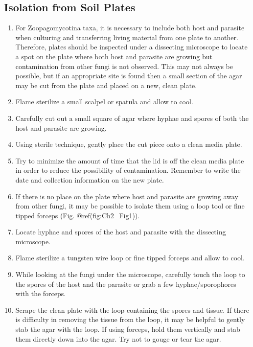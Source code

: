 \documentclass[]{book}
\providecommand{\tightlist}{%
  \setlength{\itemsep}{0pt}\setlength{\parskip}{0pt}}
\begin{document}
\subsection{Isolation from Soil
Plates}\label{isolation-from-soil-plates}

\begin{enumerate}
\def\labelenumi{\arabic{enumi}.}
\tightlist
\item
  For Zoopagomycotina taxa, it is necessary to include both host and
  parasite when culturing and transferring living material from one
  plate to another. Therefore, plates should be inspected under a
  dissecting microscope to locate a spot on the plate where both host
  and parasite are growing but contamination from other fungi is not
  observed. This may not always be possible, but if an appropriate site
  is found then a small section of the agar may be cut from the plate
  and placed on a new, clean plate.
\item
  Flame sterilize a small scalpel or spatula and allow to cool.\\
\item
  Carefully cut out a small square of agar where hyphae and spores of
  both the host and parasite are growing.
\item
  Using sterile technique, gently place the cut piece onto a clean media
  plate.
\item
  Try to minimize the amount of time that the lid is off the clean media
  plate in order to reduce the possibility of contamination. Remember to
  write the date and collection information on the new plate.
\item
  If there is no place on the plate where host and parasite are growing
  away from other fungi, it may be possible to isolate them using a loop
  tool or fine tipped forceps (Fig. @ref(fig:Ch2\_Fig1)).
\item
  Locate hyphae and spores of the host and parasite with the dissecting
  microscope.
\item
  Flame sterilize a tungsten wire loop or fine tipped forceps and allow
  to cool.
\item
  While looking at the fungi under the microscope, carefully touch the
  loop to the spores of the host and the parasite or grab a few
  hyphae/sporophores with the forceps.\\
\item
  Scrape the clean plate with the loop containing the spores and tissue.
  If there is difficulty in removing the tissue from the loop, it may be
  helpful to gently stab the agar with the loop. If using forceps, hold
  them vertically and stab them directly down into the agar. Try not to
  gouge or tear the agar.
\end{enumerate}
\end{document}

